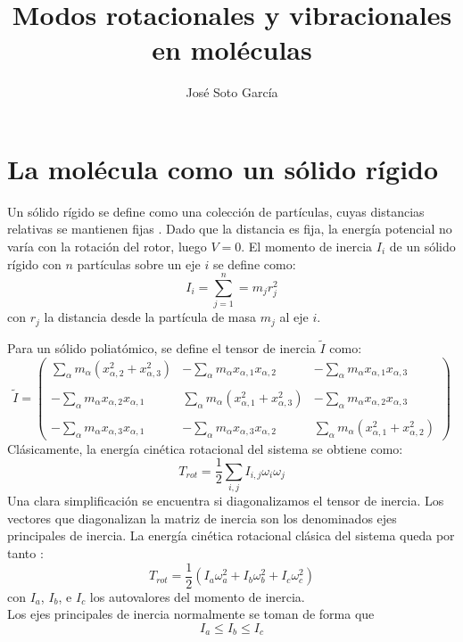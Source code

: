 \documentclass[a4paper]{article}
\title{Modos rotacionales y vibracionales en moléculas}
\author{José Soto García}
\begin{document}
\maketitle
\newpage
\tableofcontents
\newpage
\section{La molécula como un sólido rígido}
Un sólido rígido se define como una colección de partículas, cuyas distancias relativas se mantienen fijas \cite{marion2013}. Dado que la distancia es fija, la energía potencial no varía con la rotación del rotor, luego $V=0$. El momento de inercia $I_i$ de un sólido rígido con $n$ partículas sobre un eje $i$ se define como:
\begin{equation}
I_i= \sum_{j=1}^n=m_jr_j^2
\end{equation}
con $r_j$ la distancia desde la partícula de masa $m_j$ al eje $i$.

Para un sólido poliatómico, se define el tensor de inercia $\tilde{I}$ como:
\begin{equation}
\tilde{I}=\begin{pmatrix}
\displaystyle\sum_{\alpha}m_{\alpha}\left(x^2_{\alpha,2}+x^2_{\alpha,3}\right) & -\displaystyle\sum_{\alpha}m_{\alpha}x_{\alpha,1}x_{\alpha,2} & -\displaystyle\sum_{\alpha}m_{\alpha}x_{\alpha,1}x_{\alpha,3} \\\\
-\displaystyle\sum_{\alpha}m_{\alpha}x_{\alpha,2}x_{\alpha,1} & \displaystyle\sum_{\alpha}m_{\alpha}\left(x^2_{\alpha,1}+x^2_{\alpha,3}\right) &-\displaystyle\sum_{\alpha}m_{\alpha}x_{\alpha,2}x_{\alpha,3} \\\\
-\displaystyle\sum_{\alpha}m_{\alpha}x_{\alpha,3}x_{\alpha,1} & -\displaystyle\sum_{\alpha}m_{\alpha}x_{\alpha,3}x_{\alpha,2} & \displaystyle\sum_{\alpha}m_{\alpha}\left(x^2_{\alpha,1}+x^2_{\alpha,2}\right) \end{pmatrix}
\end{equation}
Clásicamente, la energía cinética rotacional del sistema se obtiene como:
\begin{equation}
T_{rot}=\frac{1}{2}\sum_{i,j}I_{i,j}\omega_i\omega_j
\end{equation}
Una clara simplificación se encuentra si diagonalizamos el tensor de inercia. Los vectores que diagonalizan la matriz de inercia son los denominados ejes principales de inercia. La energía cinética rotacional clásica del sistema queda por tanto \cite{marion2013}:
\begin{equation}
T_{rot}=\frac{1}{2}\left(I_a\omega^2_a + I_b\omega^2_b + I_c\omega^2_c\right) 
\end{equation}
con $I_a$, $I_b$, e $I_c$ los autovalores del momento de inercia.\\
Los ejes principales de inercia normalmente se toman de forma que
\begin{equation}
I_a \leq I_b \leq I_c
\end{equation}
\end{document}
